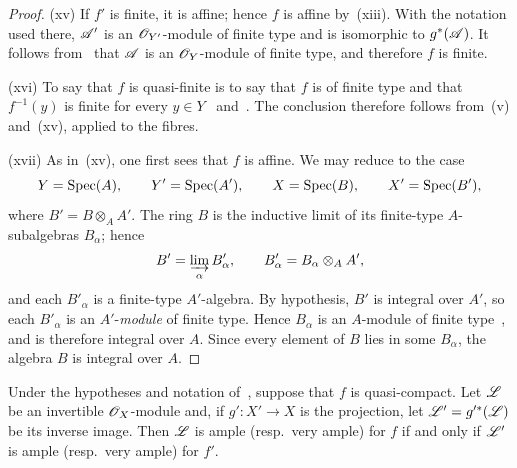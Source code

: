 \begin{proof}

\textnormal{(xv)} If $f'$ is finite, it is affine; hence $f$ is affine
by~\textnormal{(xiii)}. With the notation used there, $\mathscr{A}'$ is an
$\mathscr{O}_{Y'}$-module of finite type and is isomorphic to
$g^*(\mathscr{A})$. It follows from~ that $\mathscr{A}$ is an
$\mathscr{O}_Y$-module of finite type, and therefore $f$ is finite.

\textnormal{(xvi)} To say that $f$ is quasi-finite is to say that $f$
is of finite type and that $f^{-1}(y)$ is finite for every
$y\in Y$~ and~. The conclusion
therefore follows from~\textnormal{(v)} and~\textnormal{(xv)}, applied
to the fibres.

\textnormal{(xvii)} As in~\textnormal{(xv)}, one first sees that $f$ is
affine. We may reduce to the case
\[
  Y=\operatorname{Spec}(A),\qquad Y'=\operatorname{Spec}(A'),\qquad
  X=\operatorname{Spec}(B),\qquad X'=\operatorname{Spec}(B'),
\]
where $B'=B\otimes_A A'$. The ring $B$ is the inductive limit of its
finite-type $A$-subalgebras $B_\alpha$; hence
\[
  B'=\varinjlim_\alpha B'_\alpha,\qquad
  B'_\alpha=B_\alpha\otimes_A A',
\]
and each $B'_\alpha$ is a finite-type $A'$-algebra. By hypothesis,
$B'$ is integral over $A'$, so each $B'_\alpha$ is an $A'$-\emph{module} of
finite type. Hence $B_\alpha$ is an $A$-module of finite
type~, and is therefore integral over $A$. Since every
element of $B$ lies in some $B_\alpha$, the algebra $B$ is integral
over $A$.
\end{proof}

\begin{corollary}[2.7.2]
\label{IV.2.7.2}
Under the hypotheses and notation of~, suppose that $f$
is quasi-compact. Let $\mathscr{L}$ be an invertible $\mathscr{O}_X$-module and,
if $g':X'\to X$ is the projection, let
$\mathscr{L}'=g'^*(\mathscr{L})$ be its inverse image. Then $\mathscr{L}$ is ample
\textup{(resp.}\ very ample\textnormal{)} for $f$ if and only if
$\mathscr{L}'$ is ample \textup{(resp.}\ very ample\textnormal{)} for
$f'$.
\end{corollary}

